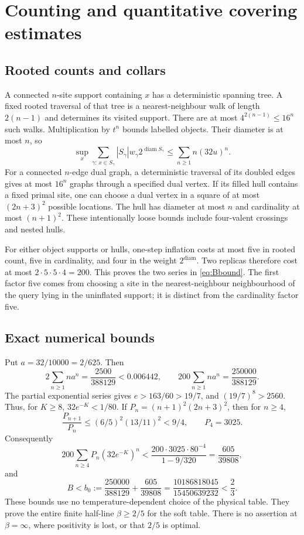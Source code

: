 \documentclass[11pt,reqno]{amsart}
\numberwithin{equation}{section}
\theoremstyle{definition}
\theoremstyle{remark}
\newcommand{\diam}{\operatorname{diam}}
\begin{document}
\section{Counting and quantitative covering estimates}\label{app:estimates}

\subsection{Rooted counts and collars}
A connected $n$-site support containing $x$ has a deterministic spanning tree. A fixed rooted traversal of that tree is a nearest-neighbour walk of length $2(n-1)$ and determines its visited support. There are at most $4^{2(n-1)}\leq16^n$ such walks. Multiplication by $t^n$ bounds labelled objects. Their diameter is at most $n$, so
\[
 \sup_x\sum_{\gamma:\,x\in S_\gamma}|S_\gamma|w_\gamma2^{\diam S_\gamma}
 \leq\sum_{n\geq1}n(32u)^n.
\]
For a connected $n$-edge dual graph, a deterministic traversal of its doubled edges gives at most $16^n$ graphs through a specified dual vertex. If its filled hull contains a fixed primal site, one can choose a dual vertex in a square of at most $(2n+3)^2$ possible locations. The hull has diameter at most $n$ and cardinality at most $(n+1)^2$. These intentionally loose bounds include four-valent crossings and nested hulls.

For either object supports or hulls, one-step inflation costs at most five in rooted count, five in cardinality, and four in the weight $2^{\diam}$. Two replicas therefore cost at most $2\cdot5\cdot5\cdot4=200$. This proves the two series in \eqref{eq:Bbound}. The first factor five comes from choosing a site in the nearest-neighbour neighbourhood of the query lying in the uninflated support; it is distinct from the cardinality factor five.

\subsection{Exact numerical bounds}
Put $a=32/10000=2/625$. Then
\[
 2\sum_{n\geq1}na^n=\frac{2500}{388129}<0.006442,
 \qquad 200\sum_{n\geq1}na^n=\frac{250000}{388129}.
\]
The partial exponential series gives $e>163/60>19/7$, and $(19/7)^8>2560$. Thus, for $K\geq8$, $32e^{-K}<1/80$. If $P_n=(n+1)^2(2n+3)^2$, then for $n\geq4$,
\[
 \frac{P_{n+1}}{P_n}\leq(6/5)^2(13/11)^2<9/4,\qquad P_4=3025.
\]
Consequently
\[
 200\sum_{n\geq4}P_n(32e^{-K})^n
 <\frac{200\cdot3025\cdot80^{-4}}{1-9/320}
 =\frac{605}{39808},
\]
and
\begin{equation}\label{eq:exactB}
 B< b_0:=\frac{250000}{388129}+\frac{605}{39808}
 =\frac{10186818045}{15450639232}<\frac23.
\end{equation}
These bounds use no temperature-dependent choice of the physical table. They prove the entire finite half-line $\beta\geq2/5$ for the soft table. There is no assertion at $\beta=\infty$, where positivity is lost, or that $2/5$ is optimal.
\end{document}
